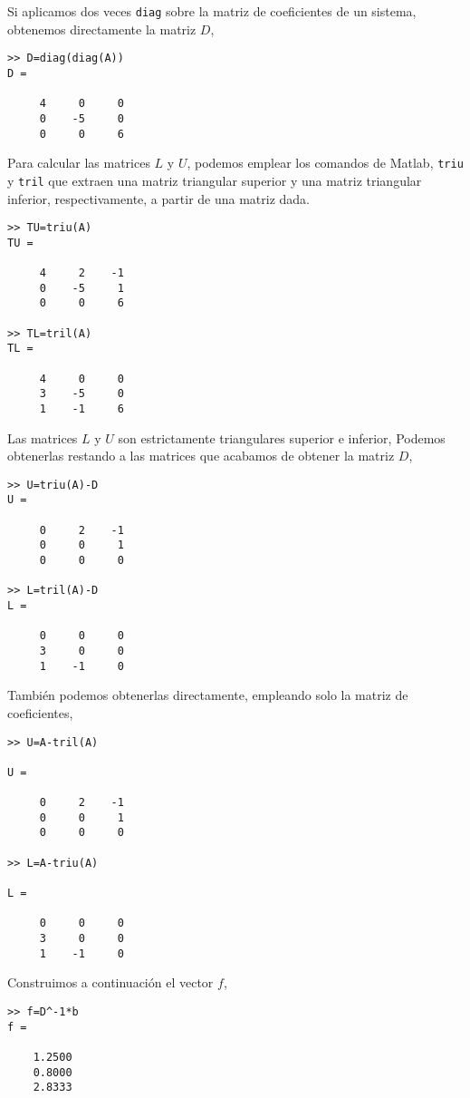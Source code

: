 Si aplicamos dos veces \texttt{diag} sobre la matriz de coeficientes de un sistema, obtenemos directamente la matriz $D$,

\begin{verbatim}
>> D=diag(diag(A))
D =

     4     0     0
     0    -5     0
     0     0     6
\end{verbatim}

Para calcular las matrices $L$ y $U$, podemos emplear los comandos de Matlab, \texttt{triu} y \texttt{tril} que extraen una matriz triangular superior y una matriz triangular inferior, respectivamente, a partir de una matriz dada.
\begin{verbatim}
>> TU=triu(A)
TU =

     4     2    -1
     0    -5     1
     0     0     6

>> TL=tril(A)
TL =

     4     0     0
     3    -5     0
     1    -1     6
\end{verbatim}

Las matrices $L$ y $U$ son estrictamente triangulares superior e inferior, Podemos obtenerlas restando a las matrices que acabamos de obtener la matriz $D$,

\begin{verbatim}
>> U=triu(A)-D
U =

     0     2    -1
     0     0     1
     0     0     0

>> L=tril(A)-D
L =

     0     0     0
     3     0     0
     1    -1     0
\end{verbatim}

También podemos obtenerlas directamente, empleando solo la matriz de coeficientes,

\begin{verbatim}
>> U=A-tril(A)

U =

     0     2    -1
     0     0     1
     0     0     0

>> L=A-triu(A)

L =

     0     0     0
     3     0     0
     1    -1     0
\end{verbatim}

Construimos a continuación el vector $f$,

\begin{verbatim}
>> f=D^-1*b
f =

    1.2500
    0.8000
    2.8333
\end{verbatim}

